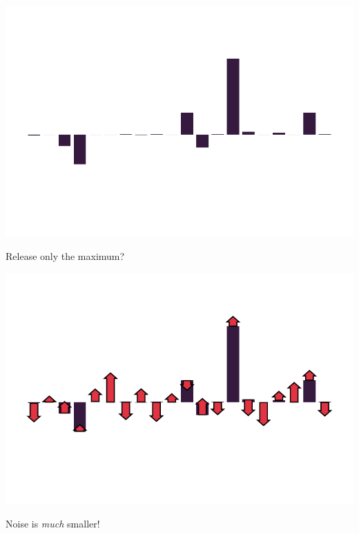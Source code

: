 \documentclass{beamer}
\begin{document}
\begin{frame}
  \vspace{1em}

  \includegraphics[width=\textwidth]{grad_example_1.pdf}

  \vspace{-2em}

  \begin{center}
    {\Huge Release only the maximum?}
  \end{center}
\end{frame}


\begin{frame}
  \vspace{1em}

  \includegraphics[width=\textwidth]{grad_example_noisy_1.pdf}

  \vspace{-1.5em}

  \begin{center}
    \Huge Noise is \emph{much} smaller! \Smiley{}
  \end{center}
  \addtocounter{framenumber}{-1}
\end{frame}
\end{document}
